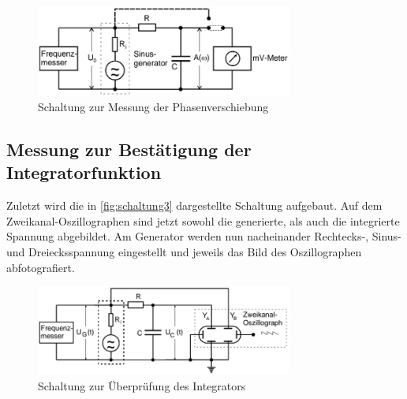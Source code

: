 \begin{figure}[H]
    \centering
    \includegraphics[width=0.75\textwidth]{Dateien/Schaltung2.jpg}
    \caption{Schaltung zur Messung der Phasenverschiebung}
    \label{fig:schaltung2}
\end{figure}


\subsection{Messung zur Bestätigung der Integratorfunktion}

Zuletzt wird die in \autoref{fig:schaltung3} dargestellte Schaltung aufgebaut. Auf dem Zweikanal-Oszillographen sind jetzt sowohl die generierte, als auch die integrierte Spannung abgebildet. Am Generator werden
nun nacheinander Rechtecks-, Sinus- und Dreiecksspannung eingestellt und jeweils das Bild des Oszillographen abfotografiert.

\begin{figure}[H]
    \centering
    \includegraphics[width=0.75\textwidth]{Dateien/Schaltung3.jpg}
    \caption{Schaltung zur Überprüfung des Integrators}
    \label{fig:schaltung3}
\end{figure}



